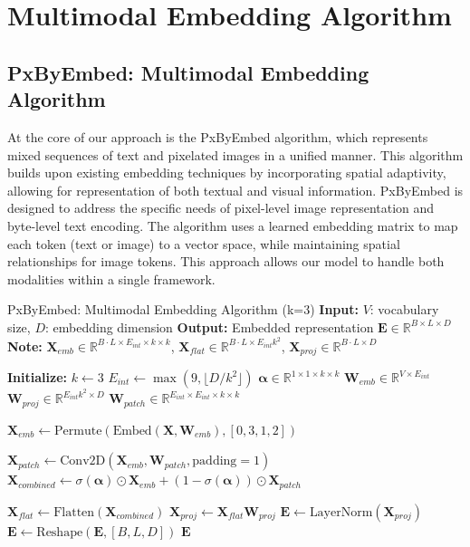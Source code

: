 \documentclass[10pt,a4paper]{article}
\begin{document}
\section{Multimodal Embedding Algorithm}

\subsection{PxByEmbed: Multimodal Embedding Algorithm}

At the core of our approach is the PxByEmbed algorithm, which represents mixed sequences of text and pixelated images in a unified manner. This algorithm builds upon existing embedding techniques by incorporating spatial adaptivity, allowing for representation of both textual and visual information. PxByEmbed is designed to address the specific needs of pixel-level image representation and byte-level text encoding. The algorithm uses a learned embedding matrix to map each token (text or image) to a vector space, while maintaining spatial relationships for image tokens. This approach allows our model to handle both modalities within a single framework.

\begin{algorithm}[ht]
\caption{PxByEmbed: Multimodal Embedding Algorithm (k=3)
\newline
\textbf{Input:} $V$: vocabulary size, $D$: embedding dimension
\newline
\textbf{Output:} Embedded representation $\mathbf{E} \in \mathbb{R}^{B \times L \times D}$
\newline
\textbf{Note:} $\mathbf{X}_{emb} \in \mathbb{R}^{B \cdot L \times E_{int} \times k \times k}$, 
$\mathbf{X}_{flat} \in \mathbb{R}^{B \cdot L \times E_{int}k^2}$, 
$\mathbf{X}_{proj} \in \mathbb{R}^{B \cdot L \times D}$
}
\begin{algorithmic}[0]
\State \textbf{Initialize:}
\State $k \gets 3$
\State $E_{int} \gets \max(9, \lfloor D / k^2 \rfloor)$
\State $\mathbf{\alpha} \in \mathbb{R}^{1 \times 1 \times k \times k}$ 
\State $\mathbf{W}_{emb} \in \mathbb{R}^{V \times E_{int}}$ 
\State $\mathbf{W}_{proj} \in \mathbb{R}^{E_{int}k^2 \times D}$ 
\State $\mathbf{W}_{patch} \in \mathbb{R}^{E_{int} \times E_{int} \times k \times k}$ 

    \State $\mathbf{X}_{emb} \gets \text{Permute}(\text{Embed}(\mathbf{X}, \mathbf{W}_{emb}), [0, 3, 1, 2])$ 
    
    \State $\mathbf{X}_{patch} \gets \text{Conv2D}(\mathbf{X}_{emb}, \mathbf{W}_{patch}, \text{padding}=1)$
    \State $\mathbf{X}_{combined} \gets \sigma(\mathbf{\alpha}) \odot \mathbf{X}_{emb} + (1 - \sigma(\mathbf{\alpha})) \odot \mathbf{X}_{patch}$
    
    \State $\mathbf{X}_{flat} \gets \text{Flatten}(\mathbf{X}_{combined})$ 
    \State $\mathbf{X}_{proj} \gets \mathbf{X}_{flat}\mathbf{W}_{proj}$ 
    \State $\mathbf{E} \gets \text{LayerNorm}(\mathbf{X}_{proj})$
    \State $\mathbf{E} \gets \text{Reshape}(\mathbf{E}, [B, L, D])$
    \State \Return $\mathbf{E}$
\EndFunction
\end{algorithmic}
\end{algorithm}
\end{document}
